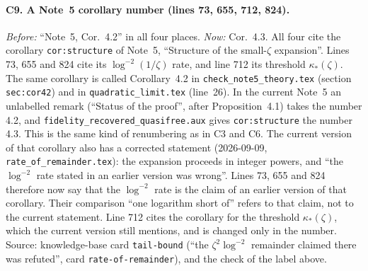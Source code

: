 \documentclass[11pt]{article}
\begin{document}
\paragraph{C9. A Note~5 corollary number (lines 73, 655, 712, 824).}
\emph{Before:} ``Note~5, Cor.~4.2'' in all four places.  \emph{Now:} Cor.~4.3.  All four cite the
corollary \texttt{cor:structure} of Note~5, ``Structure of the small-$\zeta$ expansion''.  Lines 73,
655 and 824 cite its $\log^{-2}(1/\zeta)$ rate, and line 712 its threshold $\kappa_*(\zeta)$.  The
same corollary is called Corollary~4.2 in \texttt{check\_note5\_theory.tex} (section
\texttt{sec:cor42}) and in \texttt{quadratic\_limit.tex} (line~26).  In the current Note~5 an
unlabelled remark (``Status of the proof'', after Proposition~4.1) takes the number 4.2, and
\texttt{fidelity\_recovered\_quasifree.aux} gives \texttt{cor:structure} the number 4.3.  This is the
same kind of renumbering as in C3 and C6.
The current version of that corollary also has a corrected statement (2026-09-09,
\texttt{rate\_of\_remainder.tex}): the expansion proceeds in integer powers, and ``the $\log^{-2}$
rate stated in an earlier version was wrong''.  Lines 73, 655 and 824 therefore now say that the
$\log^{-2}$ rate is the claim of an earlier version of that corollary.  Their comparison ``one
logarithm short of'' refers to that claim, not to the current statement.  Line 712 cites the
corollary for the threshold $\kappa_*(\zeta)$, which the current version still mentions, and is
changed only in the number.  Source: knowledge-base card \texttt{tail-bound} (``the $\zeta^2\log^{-2}$ remainder claimed
there was refuted'', card \texttt{rate-of-remainder}), and the check of the label above.
\end{document}
